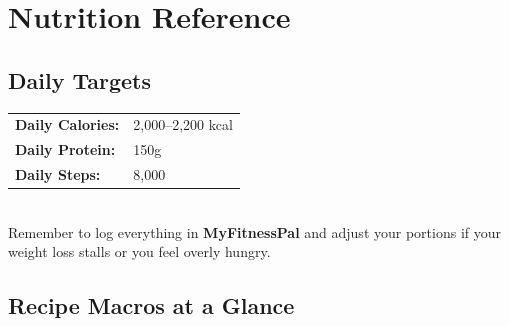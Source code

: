 \documentclass[12pt, a4paper]{book}
\begin{document}
\chapter{Nutrition Reference}

\section*{Daily Targets}

\begin{macrobox}
  \begin{tabular}{ll}
    \textbf{Daily Calories:} & 2,000--2,200 kcal \\
    \textbf{Daily Protein:}  & 150g \\
    \textbf{Daily Steps:}    & 8,000 \\
  \end{tabular}\\[8pt]
  Remember to log everything in \textbf{MyFitnessPal} and adjust your portions if your weight loss stalls or you feel overly hungry.
\end{macrobox}

\section*{Recipe Macros at a Glance}
\end{document}
